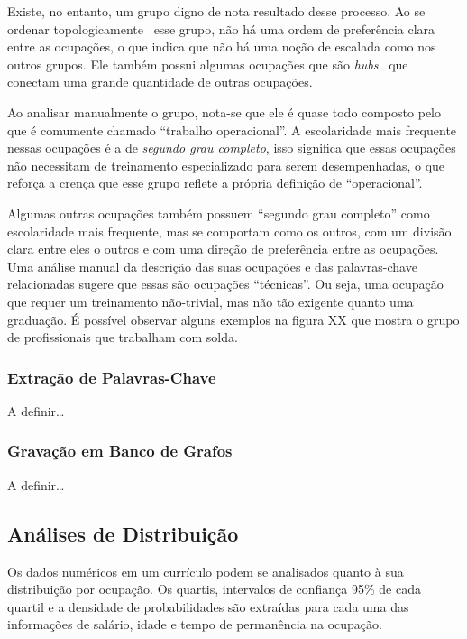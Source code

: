 \documentclass[12pt,a4paper]{article}
\begin{document}
Existe, no entanto, um grupo digno de nota resultado desse processo. Ao se ordenar topologicamente~ esse grupo, não há uma ordem de preferência clara entre as ocupações, o que indica que não há uma noção de escalada como nos outros grupos. Ele também possui algumas ocupações que são \textit{hubs}~ que conectam uma grande quantidade de outras ocupações.

Ao analisar manualmente o grupo, nota-se que ele é quase todo composto pelo que é comumente chamado \enquote{trabalho operacional}. A escolaridade mais frequente nessas ocupações é a de \textit{segundo grau completo}, isso significa que essas ocupações não necessitam de treinamento especializado para serem desempenhadas, o que reforça a crença que esse grupo reflete a própria definição de \enquote{operacional}.

Algumas outras ocupações também possuem \enquote{segundo grau completo} como escolaridade mais frequente, mas se comportam como os outros, com um divisão clara entre eles o outros e com uma direção de preferência entre as ocupações. Uma análise manual da descrição das suas ocupações e das palavras-chave relacionadas sugere que essas são ocupações \enquote{técnicas}. Ou seja, uma ocupação que requer um treinamento não-trivial, mas não tão exigente quanto uma graduação. É possível observar alguns exemplos na figura XX que mostra o grupo de profissionais que trabalham com solda.

\subsubsection{Extração de Palavras-Chave}

A definir\ldots

\subsubsection{Gravação em Banco de Grafos}

A definir\ldots

\subsection{Análises de Distribuição}

Os dados numéricos em um currículo podem se analisados quanto à sua distribuição por ocupação. Os quartis, intervalos de confiança 95\% de cada quartil e a densidade de probabilidades são extraídas para cada uma das informações de salário, idade e tempo de permanência na ocupação.
\end{document}
